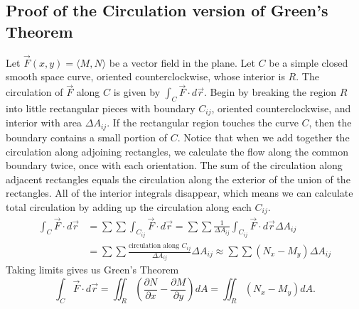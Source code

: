 \subsection{Proof of the Circulation version of Green's Theorem}
Let $\vec F(x,y) = \langle M,N\rangle$ be a vector field in the plane.  Let $C$ be
a simple closed smooth space curve, oriented counterclockwise, whose
interior is $R$.  The circulation of $\vec F$ along $C$ is given by
$\int_C\vec F\cdot d\vec r$. Begin by breaking the region {$R$} into little
rectangular pieces with boundary {$C_{ij}$}, oriented
counterclockwise, and interior with area $\Delta A_{ij}$. If the
rectangular region touches the curve {$C$}, then the boundary contains
a small portion of {$C$}.  Notice that when we add together the
circulation along adjoining rectangles, we calculate the flow along
the common boundary twice, once with each orientation.  The sum of the
circulation along adjacent rectangles equals the circulation along the
exterior of the union of the rectangles. All of the interior integrals
disappear, which means we can calculate total circulation by adding up
the circulation along each $C_{ij}$.
\begin{align*}
\int_C\vec F\cdot d\vec r  
&= \sum\sum\int_{C_{ij}}\vec F\cdot d\vec r  
= \sum\sum \frac{1}{\Delta A_{ij}}\int_{C_{ij}}\vec F\cdot d\vec r \Delta A_{ij}\\
&= \sum\sum \frac{\text{circulation along }C_{ij}}{\Delta A_{ij}} \Delta A_{ij}
 \approx \sum \sum (N_x-M_y) \Delta A_{ij}
\end{align*}
Taking limits gives us Green's Theorem $$\int_C\vec F\cdot d\vec r = \iint_R
\left(\frac{\partial N}{\partial x}-\frac{\partial M}{\partial y}\right) dA = \iint_R
\left(N_x-M_y\right) dA.$$    


